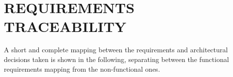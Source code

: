 \section{REQUIREMENTS TRACEABILITY}
A short and complete mapping between the requirements and architectural decisions taken is shown in the following, separating between the functional requirements mapping from the non-functional ones.
	
	

